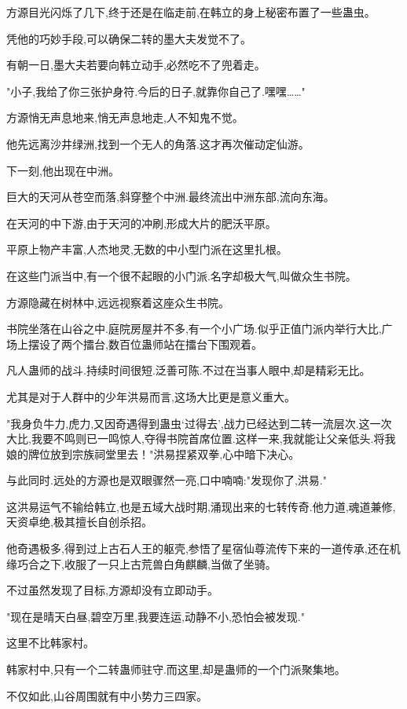 \begin{this_body}
方源目光闪烁了几下,终于还是在临走前,在韩立的身上秘密布置了一些蛊虫。

凭他的巧妙手段,可以确保二转的墨大夫发觉不了。

有朝一日,墨大夫若要向韩立动手,必然吃不了兜着走。

"小子,我给了你三张护身符.今后的日子,就靠你自己了.嘿嘿……"

方源悄无声息地来,悄无声息地走,人不知鬼不觉。

他先远离沙井绿洲,找到一个无人的角落.这才再次催动定仙游。

下一刻,他出现在中洲。

巨大的天河从苍空而落,斜穿整个中洲.最终流出中洲东部,流向东海。

在天河的中下游,由于天河的冲刷,形成大片的肥沃平原。

平原上物产丰富,人杰地灵,无数的中小型门派在这里扎根。

在这些门派当中,有一个很不起眼的小门派.名字却极大气,叫做众生书院。

方源隐藏在树林中,远远视察着这座众生书院。

书院坐落在山谷之中.庭院房屋并不多,有一个小广场.似乎正值门派内举行大比,广场上摆设了两个擂台,数百位蛊师站在擂台下围观着。

凡人蛊师的战斗.持续时间很短.泛善可陈.不过在当事人眼中,却是精彩无比。

尤其是对于人群中的少年洪易而言,这场大比更是意义重大。

"我身负牛力,虎力,又因奇遇得到蛊虫‘过得去’,战力已经达到二转一流层次.这一次大比,我要不鸣则已一鸣惊人,夺得书院首席位置.这样一来,我就能让父亲低头.将我娘的牌位放到宗族祠堂里去！"洪易捏紧双拳,心中暗下决心。

与此同时.远处的方源也是双眼骤然一亮,口中喃喃:"发现你了,洪易."

这洪易运气不输给韩立,也是五域大战时期,涌现出来的七转传奇.他力道,魂道兼修,天资卓绝,极其擅长自创杀招。

他奇遇极多,得到过上古石人王的躯壳,参悟了星宿仙尊流传下来的一道传承,还在机缘巧合之下,收服了一只上古荒兽白角麒麟,当做了坐骑。

不过虽然发现了目标,方源却没有立即动手。

"现在是晴天白昼,碧空万里,我要连运,动静不小,恐怕会被发现."

这里不比韩家村。

韩家村中,只有一个二转蛊师驻守.而这里,却是蛊师的一个门派聚集地。

不仅如此,山谷周围就有中小势力三四家。


\end{this_body}
